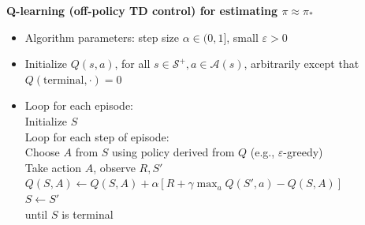 \textbf{Q-learning (off-policy TD control) for estimating $\pi \approx \pi_*$}
\begin{itemize}[leftmargin=*]
	\item[] Algorithm parameters: step size $\alpha \in (0, 1]$, small $\varepsilon > 0$
	\item[] Initialize $Q(s, a)$, for all $s \in \mathcal{S}^+, a \in \mathcal{A}(s)$, arbitrarily except that $Q(\text{terminal}, \cdot) = 0$

	\item[] Loop for each episode:\\
	      Initialize $S$\\
	      Loop for each step of episode:\\
	      \hspace*{1em} Choose $A$ from $S$ using policy derived from $Q$ (e.g., $\varepsilon$-greedy)\\
	      \hspace*{1em} Take action $A$, observe $R, S'$\\
	      \hspace*{1em} $Q(S, A) \leftarrow Q(S, A) + \alpha [R + \gamma \max_a Q(S', a) - Q(S, A)]$\\
	      \hspace*{1em} $S \leftarrow S'$\\
	      until $S$ is terminal
\end{itemize}
